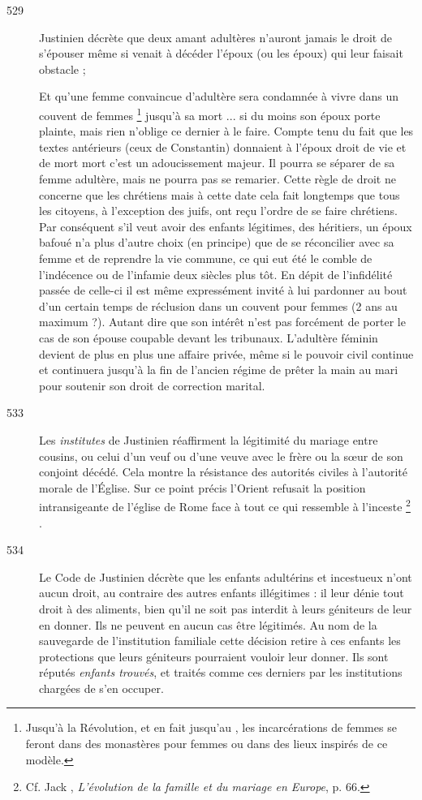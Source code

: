 \begin{description}
\item[529] Justinien décrète que deux amant adultères n'auront jamais le droit de s'épouser même si venait à décéder l'époux (ou les époux) qui leur faisait obstacle ;

Et qu'une femme convaincue d'adultère sera condamnée à vivre dans un couvent de femmes%
\footnote{Jusqu'à la Révolution, et en fait jusqu'au , les incarcérations de femmes se feront dans des monastères pour femmes ou dans des lieux inspirés de ce modèle.} 
jusqu'à sa mort ... si du moins son époux porte plainte, mais rien n'oblige ce dernier à le faire. Compte tenu du fait que les textes antérieurs (ceux de Constantin) donnaient à l'époux droit de vie et de mort mort c'est un adoucissement majeur. Il pourra se séparer de sa femme adultère, mais ne pourra pas se remarier. Cette règle de droit ne concerne que les chrétiens mais à cette date cela fait longtemps que tous les citoyens, à l'exception des juifs, ont reçu l'ordre de se faire chrétiens. Par conséquent s'il veut avoir des enfants légitimes, des héritiers, un époux bafoué n'a plus d'autre choix (en principe) que de se réconcilier avec sa femme et de reprendre la vie commune, ce qui eut été le comble de l'indécence ou de l'infamie deux siècles plus tôt. En dépit de l'infidélité passée de celle-ci il est même expressément invité à lui pardonner au bout d'un certain temps de réclusion dans un couvent pour femmes (2 ans au maximum ?). Autant dire que son intérêt n'est pas forcément de porter le cas de son épouse coupable devant les tribunaux. L'adultère féminin devient de plus en plus une affaire privée, même si le pouvoir civil continue et continuera jusqu'à la fin de l'ancien régime de prêter la main au mari pour soutenir son droit de correction marital. 

\item[533] Les \emph{institutes} de Justinien réaffirment la légitimité du mariage entre cousins, ou celui d'un veuf ou d'une veuve avec le frère ou la sœur de son conjoint décédé. Cela montre la résistance des autorités civiles à l'autorité morale de l'Église. Sur ce point précis l'Orient refusait la position intransigeante de l'église de Rome face à tout ce qui ressemble à l'inceste%
\footnote{Cf. Jack , \emph{L'évolution de la famille et du mariage en Europe}, p. 66.}%
.

\item[534] Le Code de Justinien décrète que les enfants adultérins et incestueux n'ont aucun droit, au contraire des autres enfants illégitimes : il leur dénie tout droit à des aliments, bien qu'il ne soit pas interdit à leurs géniteurs de leur en donner. Ils ne peuvent en aucun cas être légitimés. Au nom de la sauvegarde de l'institution familiale cette décision retire à ces enfants les protections que leurs géniteurs pourraient vouloir leur donner. Ils sont réputés \emph{enfants trouvés}, et traités comme ces derniers par les institutions chargées de s'en occuper. 


\end{description}
